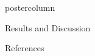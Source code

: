 \begin{frame}
\begin{columns}
\begin{column}{.59\textwidth}
\begin{beamercolorbox}[center]{postercolumn}
\begin{minipage}{.98\textwidth}
{\begin{myblock}{Results and Discussion}
\begin{itemize}
                                \end{itemize}
                            \end{myblock}\vfill

                            \begin{myblock}{References}
                                \vspace{-1em}
                                \begin{multicols}{2}
                                    \scriptsize
                                    
                                    
                                \end{multicols}
                                \vspace{-1em}
                            \end{myblock}\vfill


                        }
                    \end{minipage}
                \end{beamercolorbox}
            \end{column}

        \end{columns}
    \end{frame}

